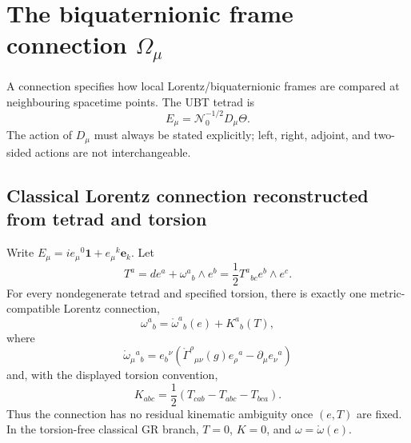 
\section{The biquaternionic frame connection $\Omega_\mu$}
\label{sec:canonical:biquaternion_connection}

A connection specifies how local Lorentz/biquaternionic frames are compared at
neighbouring spacetime points.  The UBT tetrad is
\begin{equation}
 E_\mu=\mathcal N_0^{-1/2}D_\mu\Theta.
\end{equation}
The action of $D_\mu$ must always be stated explicitly; left, right, adjoint,
and two-sided actions are not interchangeable.

\subsection{Classical Lorentz connection reconstructed from tetrad and torsion}
Write
$E_\mu=i e_\mu{}^0\mathbf1+e_\mu{}^k\mathbf e_k$.  Let
\begin{equation}
 T^a=de^a+\omega^a{}_b\wedge e^b
 =\frac12T^a{}_{bc}e^b\wedge e^c.
\end{equation}
For every nondegenerate tetrad and specified torsion, there is exactly one
metric-compatible Lorentz connection,
\begin{equation}
 \boxed{\omega^a{}_b=\mathring\omega^a{}_b(e)+K^a{}_b(T),}
 \label{eq:canonical:omega-e-T}
\end{equation}
where
\begin{equation}
 \mathring\omega_\mu{}^a{}_b
 =e_b{}^\nu\left(
 \mathring\Gamma^\rho{}_{\mu\nu}(g)e_\rho{}^a
 -\partial_\mu e_\nu{}^a
 \right)
 \label{eq:canonical:omega-from-e}
\end{equation}
and, with the displayed torsion convention,
\begin{equation}
 \boxed{K_{abc}=\frac12(T_{cab}-T_{abc}-T_{bca}).}
 \label{eq:canonical:contorsion}
\end{equation}
Thus the connection has no residual kinematic ambiguity once $(e,T)$ are
fixed.  In the torsion-free classical GR branch, $T=0$, $K=0$, and
$\omega=\mathring\omega(e)$.

